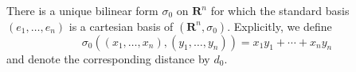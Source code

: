 There is a unique bilinear form $\sigma_0$ on $\mathbf{R}^n$ for which the standard basis $(e_1, \ldots, e_n)$ is a cartesian basis of $(\mathbf{R}^n, \sigma_0)$. Explicitly, we define
$$\sigma_0((x_1, \ldots, x_n), (y_1, \ldots, y_n)) = x_1y_1 + \cdots + x_ny_n$$
and denote the corresponding distance by $d_0$.
